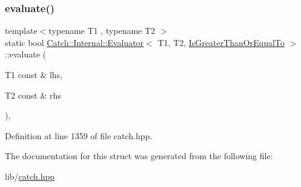 \subsubsection{\texorpdfstring{evaluate()}{evaluate()}}
{\footnotesize\ttfamily template$<$typename T1 , typename T2 $>$ \\
static bool \hyperlink{class_catch_1_1_internal_1_1_evaluator}{Catch\+::\+Internal\+::\+Evaluator}$<$ T1, T2, \hyperlink{namespace_catch_1_1_internal_ae3f96598a7858155750bf38e7295d83ead2de7e9565e59e36c0987e402203ce1c}{Is\+Greater\+Than\+Or\+Equal\+To} $>$\+::evaluate (\begin{DoxyParamCaption}\item[{T1 const \&}]{lhs,  }\item[{T2 const \&}]{rhs }\end{DoxyParamCaption})\hspace{0.3cm}{\ttfamily [inline]}, {\ttfamily [static]}}



Definition at line 1359 of file catch.\+hpp.



The documentation for this struct was generated from the following file\+:\begin{DoxyCompactItemize}
\item 
lib/\hyperlink{catch_8hpp}{catch.\+hpp}\end{DoxyCompactItemize}
